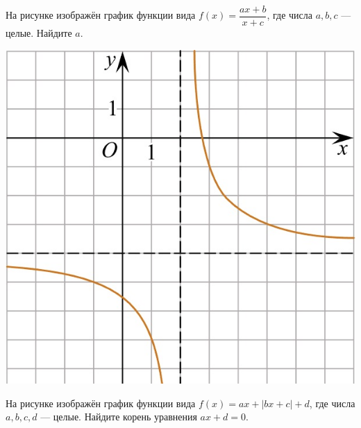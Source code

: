 \begin{homework}[number=2]
\begin{listofex}
\begin{minipage}[c]{0.1\textwidth}
		\end{minipage}
		\item
		\begin{minipage}[t]{0.43\textwidth}
			На рисунке изображён график функции вида \(f(x)=\dfrac{ax+b}{x+c}\), где числа \(a, b, c\) --- целые. Найдите \(a\).
		\end{minipage}
		\begin{minipage}[c]{0.1\textwidth}
			\includegraphics[align=t, width=\textwidth]{pics/G101M4H2-11.jpg}
		\end{minipage}
		\newpage
		\item
		\begin{minipage}[t]{0.43\textwidth}
			На рисунке изображён график функции вида \(f(x)=ax+|bx+c|+d\), где числа \(a, b, c, d\) --- целые. Найдите корень уравнения \(ax+d=0\).
		\end{minipage}
		\begin{minipage}[c]{0.1\textwidth}

\end{minipage}
\end{listofex}
\end{homework}
